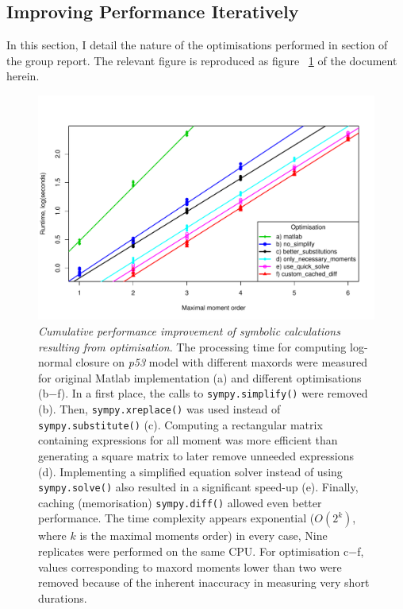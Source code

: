 \documentclass[11pt,a4paper]{article}
\newcommand{\pft}{\textit{p53}}
\newcommand{\citationneeded}[2][]{\todo[color=brown, fancyline, #1]{\textbf{Citation Needed:} #2}}
\begin{document}
 
\subsection{Improving Performance Iteratively}
In this section, I detail the nature of the optimisations performed in section\citationneeded{} of the group report.
The relevant figure is reproduced as figure ~\ref{fig:mea_speed} of the document herein.

\begin{figure}[tbh]
\includegraphics[width=0.95\textwidth{}]{mea_speed.pdf}
\caption{\emph{Cumulative performance improvement of symbolic
calculations resulting from optimisation}.
The processing time for computing log-normal closure on \pft{} model with different \gls{maxord}s were measured for original Matlab implementation (a) and different optimisations (b$-$f).
In a first place, the calls to \texttt{sympy.simplify()} were removed (b).
Then, \texttt{sympy.xreplace()} was used instead of \texttt{sympy.substitute()} (c).
Computing a rectangular matrix containing expressions for all moment was more efficient than generating a square matrix to later remove unneeded expressions (d).
Implementing a simplified equation solver instead of using \texttt{sympy.solve()} also resulted in a significant speed-up (e).
Finally, caching (memorisation) \texttt{sympy.diff()} allowed even better performance.
The time complexity appears exponential ($O(2^k)$, where $k$ is the maximal moments order) in every case,
Nine replicates were performed on the same CPU.
For optimisation c$-$f, values corresponding to \gls{maxord} moments lower than two were removed because of
the inherent inaccuracy in measuring very short durations.}
\label{fig:mea_speed}
\end{figure}
\end{document}
